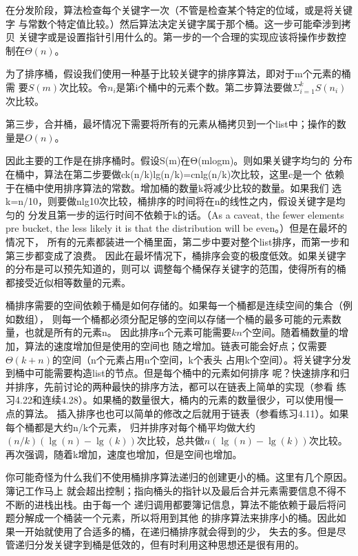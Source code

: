 在分发阶段，算法检查每个关键字一次（不管是检查某个特定的位域，或是将关键字
与常数个特定值比较。）然后算法决定关键字属于那个桶。这一步可能牵涉到拷贝
关键字或是设置指针引用什么的。第一步的一个合理的实现应该将操作步数控制在$\Theta(n)$。

为了排序桶，假设我们使用一种基于比较关键字的排序算法，即对于m个元素的桶需
要$S(m)$次比较。令$n_i$是第i个桶中的元素个数。第二步算法要做$\Sigma_{i=1}^kS(n_i)$
次比较。

第三步，合并桶，最坏情况下需要将所有的元素从桶拷贝到一个list中；操作的数量是$O(n)$。

因此主要的工作是在排序桶时。假设S(m)在Θ(mlogm)。则如果关键字均匀的
分布在桶中，算法在第二步要做ck(n/k)lg(n/k)=cnlg(n/k)次比较，这里c是一个
依赖于在桶中使用排序算法的常数。增加桶的数量k将减少比较的数量。如果我们
选k=n/10，则要做nlg10次比较，桶排序的时间将在n的线性之内，假设关键字是均匀的
分发且第一步的运行时间不依赖于k的话。（As a caveat, the fewer elements pre bucket,
the less likely it is that the distribution will be even。）但是在最坏的情况下，
所有的元素都装进一个桶里面，第二步中要对整个list排序，而第一步和第三步都变成了浪费。
因此在最坏情况下，桶排序会变的极度低效。如果关键字的分布是可以预先知道的，则可以
调整每个桶保存关键字的范围，使得所有的桶都接受近似相等数量的元素。

桶排序需要的空间依赖于桶是如何存储的。如果每一个桶都是连续空间的集合（例如数组），
则每一个桶都必须分配足够的空间以存储一个桶的最多可能的元素数量，也就是所有的元素n。
因此排序n个元素可能需要$kn$个空间。随着桶数量的增加，算法的速度增加但是使用的空间也
随之增加。链表可能会好点；仅需要$\Theta(k+n)$的空间（n个元素占用n个空间，k个表头
占用k个空间）。将关键字分发到桶中可能需要构造list的节点。但是每个桶中的元素如何排序
呢？快速排序和归并排序，先前讨论的两种最快的排序方法，都可以在链表上简单的实现（参看
练习4.22和连续4.28）。如果桶的数量很大，桶内的元素的数量很少，可以使用慢一点的算法。
插入排序也也可以简单的修改之后就用于链表（参看练习4.11）。如果每个桶都是大约n/k个元素，
归并排序对每个桶平均做大约$(n/k)(\lg(n)-\lg(k))$次比较，总共做$n(\lg(n)-\lg(k))$次比较。
再次强调，随着k增加，速度也增加，但是空间也增加。

你可能奇怪为什么我们不使用桶排序算法递归的创建更小的桶。这里有几个原因。簿记工作马上
就会超出控制；指向桶头的指针以及最后合并元素需要信息不得不不断的进栈出栈。由于每一个
递归调用都要簿记信息，算法不能依赖于最后将问题分解成一个桶装一个元素，所以将用到其他
的排序算法来排序小的桶。因此如果一开始就使用了合适多的桶，在递归桶排序就会得到的少，
失去的多。但是尽管递归分发关键字到桶是低效的，但有时利用这种思想还是很有用的。

